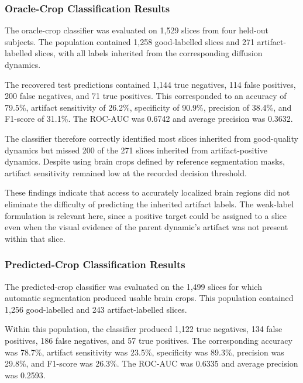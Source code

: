 \subsubsection{Oracle-Crop Classification Results}
\label{subsec:results_oracle_classification}

The oracle-crop classifier was evaluated on 1,529 slices from four held-out subjects. The population contained 1,258 good-labelled slices and 271 artifact-labelled slices, with all labels inherited from the corresponding diffusion dynamics.

The recovered test predictions contained 1,144 true negatives, 114 false positives, 200 false negatives, and 71 true positives. This corresponded to an accuracy of 79.5\%, artifact sensitivity of 26.2\%, specificity of 90.9\%, precision of 38.4\%, and F1-score of 31.1\%. The ROC-AUC was 0.6742 and average precision was 0.3632.

The classifier therefore correctly identified most slices inherited from good-quality dynamics but missed 200 of the 271 slices inherited from artifact-positive dynamics. Despite using brain crops defined by reference segmentation masks, artifact sensitivity remained low at the recorded decision threshold.

These findings indicate that access to accurately localized brain regions did not eliminate the difficulty of predicting the inherited artifact labels. The weak-label formulation is relevant here, since a positive target could be assigned to a slice even when the visual evidence of the parent dynamic's artifact was not present within that slice.

\subsubsection{Predicted-Crop Classification Results}
\label{subsec:results_predicted_crop_classification}

The predicted-crop classifier was evaluated on the 1,499 slices for which automatic segmentation produced usable brain crops. This population contained 1,256 good-labelled and 243 artifact-labelled slices.

Within this population, the classifier produced 1,122 true negatives, 134 false positives, 186 false negatives, and 57 true positives. The corresponding accuracy was 78.7\%, artifact sensitivity was 23.5\%, specificity was 89.3\%, precision was 29.8\%, and F1-score was 26.3\%. The ROC-AUC was 0.6335 and average precision was 0.2593.


